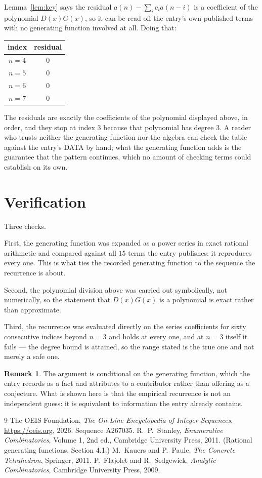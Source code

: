 \documentclass[11pt,a4paper]{article}
\theoremstyle{plain}
\theoremstyle{definition}
\newtheorem{remark}[theorem]{Remark}
\begin{document}
Lemma~\ref{lem:key} says the residual $a(n)-\sum_ic_ia(n-i)$ is a coefficient of the
polynomial $D(x)G(x)$, so it can be read off the entry's own published terms with no
generating function involved at all. Doing that:
\begin{center}
\begin{tabular}{cc}
index & residual \\ \hline
$n=4$ & $0$ \\
$n=5$ & $0$ \\
$n=6$ & $0$ \\
$n=7$ & $0$
\end{tabular}
\end{center}
The residuals are exactly the coefficients of the polynomial displayed above, in order, and
they stop at index $3$ because that polynomial has degree $3$. A reader who trusts
neither the generating function nor the algebra can check the table against the entry's DATA
by hand; what the generating function adds is the guarantee that the pattern continues, which
no amount of checking terms could establish on its own.

\section{Verification}

Three checks.

First, the generating function was expanded as a power series in exact rational arithmetic and
compared against all $15$ terms the entry publishes: it reproduces every one. This is
what ties the recorded generating function to the sequence the recurrence is about.

Second, the polynomial division above was carried out symbolically, not numerically, so the
statement that $D(x)G(x)$ is a polynomial is exact rather than approximate.

Third, the recurrence was evaluated directly on the series coefficients for sixty consecutive
indices beyond $n=3$ and holds at every one, and at $n=3$ itself it fails --- the
degree bound is attained, so the range stated is the true one and not merely a safe one.

\begin{remark}
The argument is conditional on the generating function, which the entry records as a fact and
attributes to a contributor rather than offering as a conjecture. What is shown here is that
the empirical recurrence is not an independent guess: it is equivalent to information the
entry already contains.
\end{remark}

\begin{thebibliography}{9}
 The OEIS Foundation, \emph{The On-Line Encyclopedia of Integer
Sequences}, \url{https://oeis.org}, 2026. Sequence A267035.
 R.~P.~Stanley, \emph{Enumerative Combinatorics}, Volume 1, 2nd ed.,
Cambridge University Press, 2011. (Rational generating functions, Section 4.1.)
 M.~Kauers and P.~Paule, \emph{The Concrete Tetrahedron}, Springer, 2011.
 P.~Flajolet and R.~Sedgewick, \emph{Analytic Combinatorics}, Cambridge
University Press, 2009.
\end{thebibliography}
\end{document}
